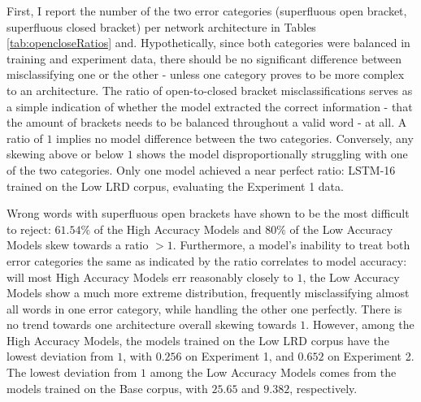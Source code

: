 

First, I report the number of the two error categories (superfluous open bracket, superfluous closed bracket) per network architecture in Tables \ref{tab:opencloseRatios} and. Hypothetically, since both categories were balanced in training and experiment data, there should be no significant difference between misclassifying one or the other - unless one category proves to be more complex to an architecture. The ratio of open-to-closed bracket misclassifications serves as a simple indication of whether the model extracted the correct information - that the amount of brackets needs to be balanced throughout a valid word - at all. A ratio of $1$ implies no model difference between the two categories. Conversely, any skewing above or below $1$ shows the model disproportionally struggling with one of the two categories. Only one model achieved a near perfect ratio: LSTM-16 trained on the Low LRD corpus, evaluating the Experiment 1 data.

Wrong words with superfluous open brackets have shown to be the most difficult to reject: $61.54\%$ of the High Accuracy Models and $80\%$ of the Low Accuracy Models skew towards a ratio $> 1$. Furthermore, a model's inability to treat both error categories the same as indicated by the ratio correlates to model accuracy: will most High Accuracy Models err reasonably closely to $1$, the Low Accuracy Models show a much more extreme distribution, frequently misclassifying almost all words in one error category, while handling the other one perfectly. There is no trend towards one architecture overall skewing towards $1$. However, among the High Accuracy Models, the models trained on the Low LRD corpus have the lowest deviation from $1$, with $0.256$ on Experiment 1, and $0.652$ on Experiment 2. The lowest deviation from $1$ among the Low Accuracy Models comes from the models trained on the Base corpus, with $25.65$ and $9.382$, respectively.


